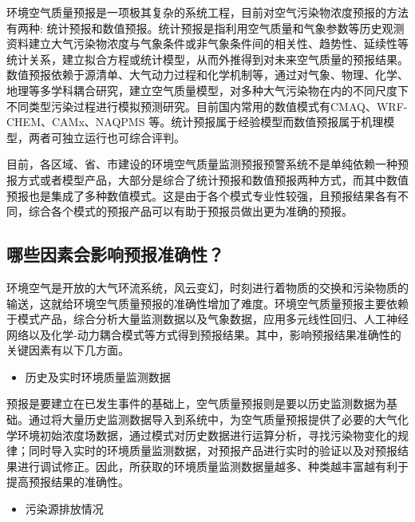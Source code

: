 \documentclass[
]{book}
\providecommand{\tightlist}{%
  \setlength{\itemsep}{0pt}\setlength{\parskip}{0pt}}
\begin{document}
环境空气质量预报是一项极其复杂的系统工程，目前对空气污染物浓度预报的方法有两种: 统计预报和数值预报。统计预报是指利用空气质量和气象参数等历史观测资料建立大气污染物浓度与气象条件或非气象条件间的相关性、趋势性、延续性等统计关系，建立拟合方程或统计模型，从而外推得到对未来空气质量的预报结果。数值预报依赖于源清单、大气动力过程和化学机制等，通过对气象、物理、化学、地理等多学科耦合研究，建立空气质量模型，对多种大气污染物在内的不同尺度下不同类型污染过程进行模拟预测研究。目前国内常用的数值模式有CMAQ、WRF-CHEM、CAMx、NAQPMS 等。统计预报属于经验模型而数值预报属于机理模型，两者可独立运行也可综合评判。

目前，各区域、省、市建设的环境空气质量监测预报预警系统不是单纯依赖一种预报方式或者模型产品，大部分是综合了统计预报和数值预报两种方式，而其中数值预报也是集成了多种数值模式。这是由于各个模式专业性较强，且预报结果各有不同，综合各个模式的预报产品可以有助于预报员做出更为准确的预报。

\hypertarget{ux54eaux4e9bux56e0ux7d20ux4f1aux5f71ux54cdux9884ux62a5ux51c6ux786eux6027}{%
\subsection{哪些因素会影响预报准确性？}\label{ux54eaux4e9bux56e0ux7d20ux4f1aux5f71ux54cdux9884ux62a5ux51c6ux786eux6027}}

环境空气是开放的大气环流系统，风云变幻，时刻进行着物质的交换和污染物质的输送，这就给环境空气质量预报的准确性增加了难度。环境空气质量预报主要依赖于模式产品，综合分析大量监测数据以及气象数据，应用多元线性回归、人工神经网络以及化学-动力耦合模式等方式得到预报结果。其中，影响预报结果准确性的关键因素有以下几方面。

\begin{itemize}
\tightlist
\item
  历史及实时环境质量监测数据
\end{itemize}

预报是要建立在已发生事件的基础上，空气质量预报则是要以历史监测数据为基础。通过将大量历史监测数据导入到系统中，为空气质量预报提供了必要的大气化学环境初始浓度场数据，通过模式对历史数据进行运算分析，寻找污染物变化的规律；同时导入实时的环境质量监测数据，对预报产品进行实时的验证以及对预报结果进行调试修正。因此，所获取的环境质量监测数据量越多、种类越丰富越有利于提高预报结果的准确性。

\begin{itemize}
\tightlist
\item
  污染源排放情况
\end{itemize}
\end{document}
